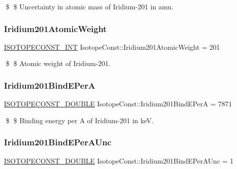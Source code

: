\$ \$ Uncertainty in atomic mass of Iridium-\/201 in amu. \mbox{\label{group___isotope_const-_iridium-_ir201_ga47236220acf78d3f723c334bb7ed9c9b}} 
\subsubsection{\texorpdfstring{Iridium201\+Atomic\+Weight}{Iridium201AtomicWeight}}
{\footnotesize\ttfamily \mbox{\hyperlink{group___isotope_const-_macros_ga5f18360b3e99483a35c32d789e62621c}{I\+S\+O\+T\+O\+P\+E\+C\+O\+N\+S\+T\+\_\+\+I\+NT}} Isotope\+Const\+::\+Iridium201\+Atomic\+Weight = 201}

\$ \$ Atomic weight of Iridium-\/201. \mbox{\label{group___isotope_const-_iridium-_ir201_ga43486fd2dc6a93e41e23c18fb99acfb1}} 
\subsubsection{\texorpdfstring{Iridium201\+Bind\+E\+PerA}{Iridium201BindEPerA}}
{\footnotesize\ttfamily \mbox{\hyperlink{group___isotope_const-_macros_ga8f45a7272ce02c0b4c65c44636ed719a}{I\+S\+O\+T\+O\+P\+E\+C\+O\+N\+S\+T\+\_\+\+D\+O\+U\+B\+LE}} Isotope\+Const\+::\+Iridium201\+Bind\+E\+PerA = 7871}

\$ \$ Binding energy per A of Iridium-\/201 in keV. \mbox{\label{group___isotope_const-_iridium-_ir201_ga86de69da3081d0dfc56c41c5fce67c3b}} 
\subsubsection{\texorpdfstring{Iridium201\+Bind\+E\+Per\+A\+Unc}{Iridium201BindEPerAUnc}}
{\footnotesize\ttfamily \mbox{\hyperlink{group___isotope_const-_macros_ga8f45a7272ce02c0b4c65c44636ed719a}{I\+S\+O\+T\+O\+P\+E\+C\+O\+N\+S\+T\+\_\+\+D\+O\+U\+B\+LE}} Isotope\+Const\+::\+Iridium201\+Bind\+E\+Per\+A\+Unc = 1}

